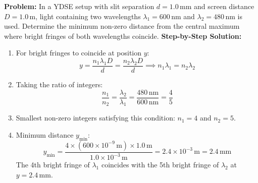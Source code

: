 \documentclass[10pt,a4paper]{article}
\begin{document}
\begin{usecasebox}
\textbf{Problem:} In a YDSE setup with slit separation $d = 1.0\,\mathrm{mm}$ and screen distance $D = 1.0\,\mathrm{m}$, light containing two wavelengths $\lambda_1 = 600\,\mathrm{nm}$ and $\lambda_2 = 480\,\mathrm{nm}$ is used. Determine the minimum non-zero distance from the central maximum where bright fringes of both wavelengths coincide.
\textbf{Step-by-Step Solution:}
\begin{enumerate}
  \item For bright fringes to coincide at position $y$:
  \begin{equation}
    y = \frac{n_1 \lambda_1 D}{d} = \frac{n_2 \lambda_2 D}{d} \implies n_1 \lambda_1 = n_2 \lambda_2
  \end{equation}
  \item Taking the ratio of integers:
  \begin{equation}
    \frac{n_1}{n_2} = \frac{\lambda_2}{\lambda_1} = \frac{480\,\mathrm{nm}}{600\,\mathrm{nm}} = \frac{4}{5}
  \end{equation}
  \item Smallest non-zero integers satisfying this condition: $n_1 = 4$ and $n_2 = 5$.
  \item Minimum distance $y_{\min}$:
  \begin{equation}
    y_{\min} = \frac{4 \times (600 \times 10^{-9}\,\mathrm{m}) \times 1.0\,\mathrm{m}}{1.0 \times 10^{-3}\,\mathrm{m}} = 2.4 \times 10^{-3}\,\mathrm{m} = \mathbf{2.4\,\mathrm{mm}}
  \end{equation}
  The 4th bright fringe of $\lambda_1$ coincides with the 5th bright fringe of $\lambda_2$ at $y = 2.4\,\mathrm{mm}$.
\end{enumerate}
\end{usecasebox}
\end{document}
